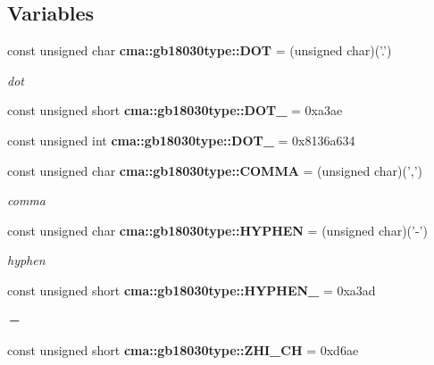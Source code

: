\subsection*{Variables}
\begin{CompactItemize}
\item 
const unsigned char {\bf cma::gb18030type::DOT} = (unsigned char)('.')\label{namespacecma_1_1gb18030type_e1e6608ed06b63d14d8c447aa1d8c563}

\begin{CompactList}\small\item\em dot \item\end{CompactList}\item 
const unsigned short \textbf{cma::gb18030type::DOT\_} = 0xa3ae\label{namespacecma_1_1gb18030type_d0fa8f1808749c9ce7ce991f030b0769}

\item 
const unsigned int \textbf{cma::gb18030type::DOT\_} = 0x8136a634\label{namespacecma_1_1gb18030type_b20d26021db9062dcaec5fcb6096e614}

\item 
const unsigned char {\bf cma::gb18030type::COMMA} = (unsigned char)(',')\label{namespacecma_1_1gb18030type_6485cf20b1cf0b5db94998f2186a8a24}

\begin{CompactList}\small\item\em comma \item\end{CompactList}\item 
const unsigned char {\bf cma::gb18030type::HYPHEN} = (unsigned char)('-')\label{namespacecma_1_1gb18030type_c2d50f13df77e6af70fc59c36ec4ec26}

\begin{CompactList}\small\item\em hyphen \item\end{CompactList}\item 
const unsigned short {\bf cma::gb18030type::HYPHEN\_} = 0xa3ad\label{namespacecma_1_1gb18030type_93eb7a5f422222b1cee4391d8da44807}

\begin{CompactList}\small\item\em － \item\end{CompactList}\item 
const unsigned short {\bf cma::gb18030type::ZHI\_\-CH} = 0xd6ae\label{namespacecma_1_1gb18030type_80eb455c3adf0ffe638fd13f70b99176}


\end{CompactItemize}
